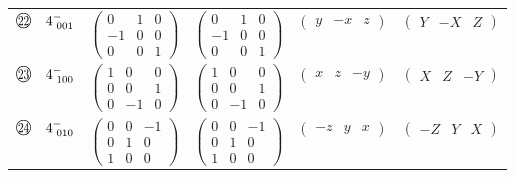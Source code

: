 \documentclass[fleqn,10pt,landscape]{jsarticle}
\begin{document}
\begin{center}
\begin{longtable}{lcccc}
$ {\ooalign{\hfil\resizebox{.8\width}{\height}{22}\hfil\crcr\raise.1ex\hbox{\large$\bigcirc$}}}\quad 4^{-}_{\,\,001} $ & $ \begin{pmatrix} 0 & 1 & 0 \\ -1 & 0 & 0 \\ 0 & 0 & 1 \end{pmatrix} $ & $ \begin{pmatrix} 0 & 1 & 0 \\ -1 & 0 & 0 \\ 0 & 0 & 1 \end{pmatrix} $ & $ \begin{pmatrix} y & - x & z \end{pmatrix} $ & $ \begin{pmatrix} Y & - X & Z \end{pmatrix} $ \\
$ {\ooalign{\hfil\resizebox{.8\width}{\height}{23}\hfil\crcr\raise.1ex\hbox{\large$\bigcirc$}}}\quad 4^{-}_{\,\,100} $ & $ \begin{pmatrix} 1 & 0 & 0 \\ 0 & 0 & 1 \\ 0 & -1 & 0 \end{pmatrix} $ & $ \begin{pmatrix} 1 & 0 & 0 \\ 0 & 0 & 1 \\ 0 & -1 & 0 \end{pmatrix} $ & $ \begin{pmatrix} x & z & - y \end{pmatrix} $ & $ \begin{pmatrix} X & Z & - Y \end{pmatrix} $ \\
$ {\ooalign{\hfil\resizebox{.8\width}{\height}{24}\hfil\crcr\raise.1ex\hbox{\large$\bigcirc$}}}\quad 4^{-}_{\,\,010} $ & $ \begin{pmatrix} 0 & 0 & -1 \\ 0 & 1 & 0 \\ 1 & 0 & 0 \end{pmatrix} $ & $ \begin{pmatrix} 0 & 0 & -1 \\ 0 & 1 & 0 \\ 1 & 0 & 0 \end{pmatrix} $ & $ \begin{pmatrix} - z & y & x \end{pmatrix} $ & $ \begin{pmatrix} - Z & Y & X \end{pmatrix} $ \\

\end{longtable}
\end{center}
\end{document}
